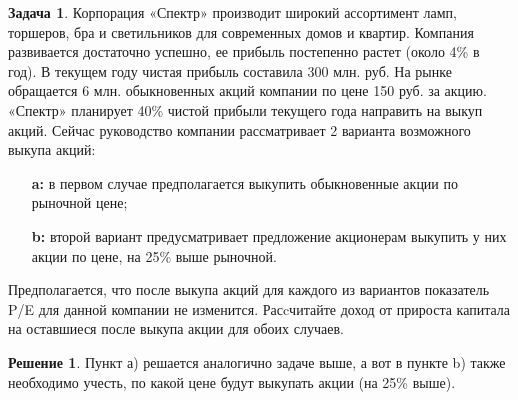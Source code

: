 \documentclass[a4paper, 14pt]{article}
\theoremstyle{plain} %
\theoremstyle{definition} %
\newtheorem*{solution}{Решение}
\newtheorem{problem}{Задача}[subsection]
\theoremstyle{remark} %
\begin{document}
\begin{problem}
	Корпорация «Спектр» производит широкий ассортимент ламп, торшеров, бра и  светильников  для  современных  домов  и  квартир.  Компания  развивается  достаточно успешно, ее прибыль постепенно растет (около 4\% в год). В текущем году чистая прибыль составила 300 млн. руб. На рынке обращается 6 млн. обыкновенных акций компании по цене 150 руб. за акцию. «Спектр» планирует 40\% чистой прибыли текущего года направить на выкуп акций. Сейчас руководство компании рассматривает 2 варианта возможного выкупа акций:
	\begin{itemize}
		\item[\textbf{a:}] в первом случае предполагается выкупить обыкновенные акции по рыночной цене;
		\item[\textbf{b:}] второй вариант предусматривает предложение акционерам выкупить у них акции по цене, на 25\% выше рыночной.
	\end{itemize}
	Предполагается, что после выкупа акций для каждого из вариантов показатель P/E для данной компании не изменится. Расcчитайте доход от прироста капитала на оставшиеся после выкупа акции для обоих случаев.
\end{problem}
	\begin{solution}
	Пункт а) решается аналогично задаче выше, а вот в пункте b) также необходимо учесть, по какой цене будут выкупать акции (на 25\% выше).
	\end{solution}
\end{document}
